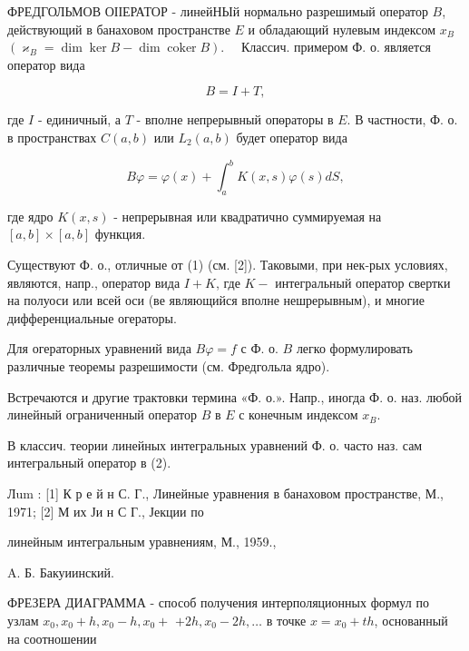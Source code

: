 \documentclass[10pt]{article}
\begin{document}
ФРЕДГОЛЬМОВ ОІІЕРАТОР - линейНЫй нормально разрешимый оператор $B$, действующий в банаховом пространстве $E$ и обладающий нулевым индексом $x_{B}$ $\left(\varkappa_{B}=\operatorname{dim} \operatorname{ker} B-\operatorname{dim} \operatorname{coker} B\right) . \quad$ Классич. примером Ф. о. является оператор вида



\[

B=I+T,

\]



где $I$ - единичный, а $T$ - вполне непрерывный опөраторы в $E$. В частности, Ф. о. в пространствах $C(a, b)$ или $L_{2}(a, b)$ будет оператор вида



\[

B \varphi=\varphi(x)+\int_{a}^{b} K(x, s) \varphi(s) d S,

\]



где ядро $K(x, s)$ - непрерывная или квадратично суммируемая на $[a, b] \times[a, b]$ функция.



Существуют Ф. о., отличные от (1) (см. [2]). Таковыми, при нек-рых условиях, являются, напр., оператор вида $I+K$, где $K-$ интегральный оператор свертки на полуоси или всей оси (ве являющийся вполне нешрерывным), и многие дифференциальные огераторы.



Для огераторных уравнений вида $B \varphi=f$ с Ф. о. $B$ легко формулировать различные теоремы разрешимости (см. Фредгольла ядро).



Встречаются и другие трактовки термина «Ф. о.». Напр., иногда Ф. о. наз. любой линейный ограниченный оператор $B$ в $E$ с конечным индексом $x_{B}$.



В классич. теории линейных интегральных уравнений Ф. о. часто наз. сам интегральный оператор в (2).



Лum : [1] К р е й н С. Г., Линейные уравнения в банаховом пространстве, М., 1971; [2] М их Ји н С Г., Јекции по

линейным интегральным уравнениям, М., 1959.,

A. Б. Бакуиинский.



ФРЕЗЕРА ДИАГРАММА - способ получения интерполяционных формул по узлам $x_{0}, x_{0}+h, x_{0}-h, x_{0}+$ $+2 h, x_{0}-2 h, \ldots$ в точке $x=x_{0}+t h$, основанный на соотношении
\end{document}
